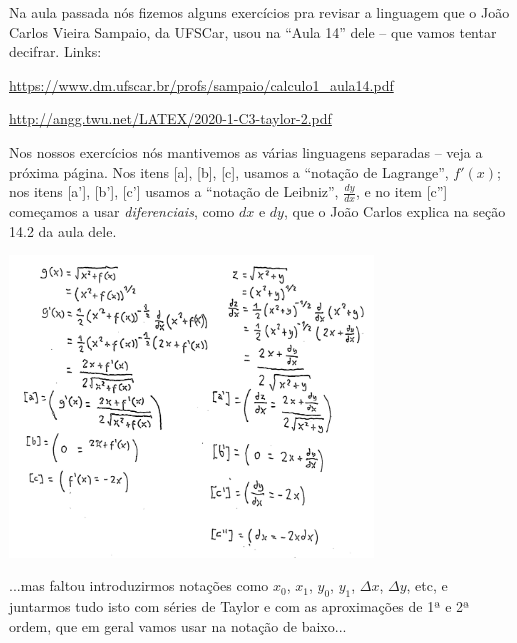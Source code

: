 \documentclass[oneside,12pt]{article}
\begin{document}
Na aula passada nós fizemos alguns exercícios pra revisar a linguagem
que o João Carlos Vieira Sampaio, da UFSCar, usou na ``Aula 14'' dele
-- que vamos tentar decifrar. Links:

\ssk

\url{https://www.dm.ufscar.br/profs/sampaio/calculo1\_aula14.pdf}

\url{http://angg.twu.net/LATEX/2020-1-C3-taylor-2.pdf}

\ssk

Nos nossos exercícios nós mantivemos as várias linguagens separadas --
veja a próxima página. Nos itens [a], [b], [c], usamos a ``notação de
Lagrange'', $f'(x)$; nos itens [a'], [b'], [c'] usamos a ``notação de
Leibniz'', $\frac{dy}{dx}$, e no item [c''] começamos a usar {\sl
  diferenciais}, como $dx$ e $dy$, que o João Carlos explica na seção
14.2 da aula dele.

\newpage


\includegraphics[height=8cm]{2020-1-C3/aula6_diferenciais.pdf}

\newpage

...mas faltou introduzirmos notações como $x_0$, $x_1$, $y_0$, $y_1$,
$Δx$, $Δy$, etc, e juntarmos tudo isto com séries de Taylor e com as
aproximações de 1ª e 2ª ordem, que em geral vamos usar na notação de
baixo...

\end{document}
